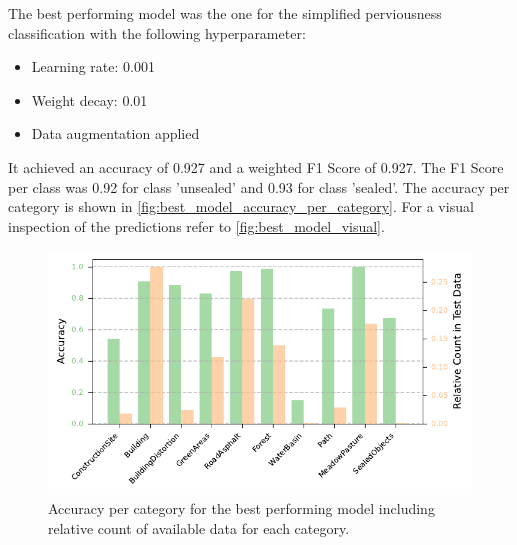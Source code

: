 The best performing model was the one for the simplified perviousness classification
with the following hyperparameter:
\begin{itemize}
    \item Learning rate: 0.001
    \item Weight decay: 0.01
    \item Data augmentation applied
\end{itemize}
It achieved an accuracy of 0.927 and a weighted F1 Score of 0.927.
The F1 Score per class was 0.92 for class 'unsealed' and 0.93 for class 'sealed'.
The accuracy per category is shown in \autoref{fig:best_model_accuracy_per_category}.
For a visual inspection of the predictions refer to \autoref{fig:best_model_visual}.

\begin{figure}[H]
    \centering
    \captionsetup{width=0.8\linewidth}
    \includegraphics{figures/best_model_accuracy_per_category.pdf}
    \caption{Accuracy per category for the best performing model including relative count of available data for each category.}
    \label{fig:best_model_accuracy_per_category}
\end{figure}

